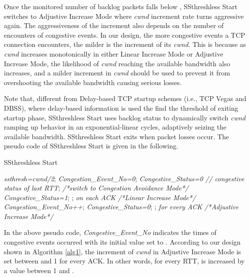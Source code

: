 \documentclass[12pt,onecolumn]{IEEEtran}
\begin{document}
Once the monitored number of backlog packets falls below , SSthreshless
Start switches to Adjustive Increase Mode where \emph{cwnd} increment rate
turns aggressive again. The aggressiveness of the increment also depends
on the number of encounters of congestive events. In our design, the more
congestive events a TCP connection encounters, the milder is the increment of
its \emph{cwnd}. This is because as \emph{cwnd} increases monotonically in
either Linear Increase Mode or Adjustive Increase Mode, the likelihood of
\emph{cwnd} reaching the available bandwidth also increases, and a milder
increment in \emph{cwnd} should be used to prevent it from overshooting the
available bandwidth causing serious losses.

Note that, different from Delay-based TCP startup schemes (i.e., TCP Vegas and
DBSS), where delay-based information is used the find the threshold of exiting
startup phase, SSthreshless Start uses backlog status to dynamically switch
\emph{cwnd} ramping up behavior in an exponential-linear cycles, adaptively
seizing the available bandwidth. SSthreshless Start exits when packet losses
occur. The pseudo code of SSthreshless Start is given in the following.

\begin{algorithm}
\caption{SSthreshless Start}
\label{alg1}
\begin{algorithmic}
    \STATE \emph{ssthresh=cwnd/2};
    \STATE \emph{Congestion\_Event\_No=0};
    \STATE \emph{Congestive\_Status=0 // congestive status of last RTT};
    \STATE \emph{/*switch to Congestion Avoidance Mode*/}
\ELSE
    \IF {()}
         \STATE \emph{Congestive\_Status=1};
         \STATE  ; \emph{on each ACK}
         \STATE \emph{/*Linear Increase Mode*/}
    \ELSE
         \STATE \emph{Congestion\_Event\_No++};
         \STATE \emph{Congestive\_Status=0};
         \ENDIF
         \STATE ;
         \STATE \emph{for every ACK}
         \STATE \emph{/*Adjustive Increase Mode*/}
    \ENDIF
\ENDIF

\end{algorithmic}
\end{algorithm}

In the above pseudo code, \emph{Congestive\_Event\_No} indicates the times of
congestive events occurred with its initial value set to . According to our
design shown in Algorithm \ref{alg1}, the increment of \emph{cwnd} in Adjustive
Increase Mode is set between  and 1 for every ACK. In other
words, for every RTT,  is increased by a value between 1 and .
\end{document}
